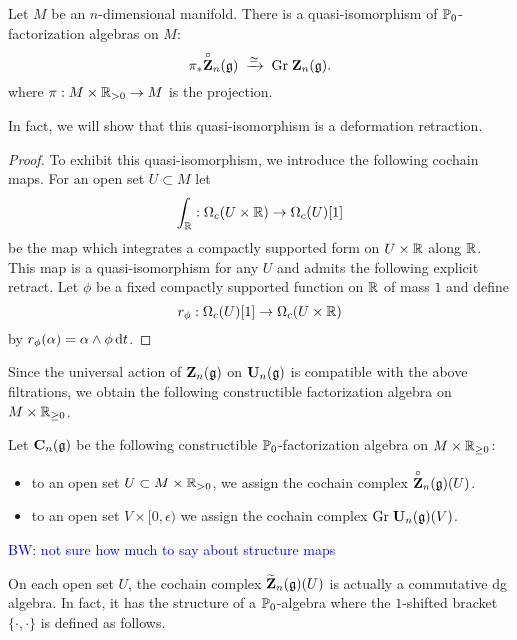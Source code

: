 \documentclass[11pt]{amsart}
\numberwithin{equation}{section}
\def\brian{\textcolor{blue}{BW: }\textcolor{blue}}
\begin{document}
 \begin{lmm}
Let $M$ be an $n$-dimensional manifold.
There is a quasi-isomorphism of  $\mathbb P_0$-factorization algebras on $M$:
\[
\pi_* \overset{\circ}{\bf Z}_n(\mathfrak g) \; \xrightarrow{\simeq} \; {\rm Gr} \; \mathbf Z_n(\mathfrak g) .
\]
where $\pi : M \times \mathbb R_{>0} \to M$ is the projection. 
\end{lmm}

In fact, we will show that this quasi-isomorphism is a deformation retraction. 

\begin{proof}
To exhibit this quasi-isomorphism, we introduce the following cochain maps.
For an open set $U \subset M$ let
\[
\int_\mathbb R : \Omega_c(U \times \mathbb R) \to \Omega_c (U) [1] 
\] 
be the map which integrates a compactly supported form on $U \times \mathbb R$ along $\mathbb R$. 
This map is a quasi-isomorphism for any $U $ and admits the following explicit retract. 
Let $\phi$ be a fixed compactly supported function on $\mathbb R$ of mass $1$ and define
\[
r_\phi : \Omega_c(U) [1] \to \Omega_c (U \times \mathbb R)
\]
by $r_\phi (\alpha) = \alpha \wedge \phi \, {\rm d} t$. 
\end{proof}

Since the universal action of $\mathbf Z_n(\mathfrak g)$ on $\mathbf U_n (\mathfrak g)$ is compatible with the above filtrations, we obtain the following constructible factorization algebra on $M \times \mathbb R_{\geq 0}$. 

\begin{dfn}\label{dfn:constructible1}
Let $\mathbf C_n(\mathfrak g)$ be the following constructible $\mathbb P_0$-factorization algebra on $M \times \mathbb R_{\geq 0}$:
\begin{itemize}
\item to an open set $U \subset M \times \mathbb R_{> 0}$, we assign the cochain complex $\overset{\circ}{\bf Z}_n (\mathfrak g)(U)$.
\item to an open set $V \times [0,\epsilon)$ we assign the cochain complex ${\rm Gr} \;\mathbf U_n(\mathfrak g)(V)$. 
\end{itemize}
\brian{not sure how much to say about structure maps}
\end{dfn}

On each open set $U$, the cochain complex $\widetilde{\mathbf Z}_n(\mathfrak g) (U)$ is actually a commutative dg algebra. 
In fact, it has the structure of a $\mathbb P_0$-algebra where the $1$-shifted bracket $\{\cdot, \cdot\}$ is defined as follows.
\end{document}

